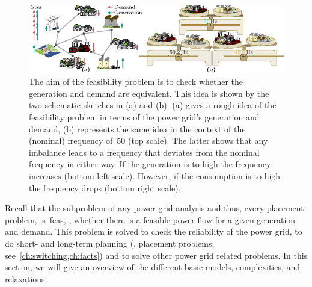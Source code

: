 % 
\begin{figure}[t!]
    \includegraphics{foundations/figures/feasibility-problem.pdf}
    \caption[Simple description of the feasibility problem.]{The aim of the
    feasibility problem is to check whether the generation and demand are
    equivalent. This idea is shown by the two schematic sketches in (a) and (b).
    (a) gives a rough idea of the feasibility problem in terms of the power
    grid's generation and demand, (b) represents the same idea in the context of
    the (nominal) frequency of~\SI{50}{} (top scale). The
    latter shows that any imbalance leads to a frequency that deviates from the
    nominal frequency in either way. If the generation is to high the frequency
    increases (bottom left scale). However, if the consumption is to high the
    frequency drops (bottom right scale).
    }%
    \label{ch:foundations:fig:feasibility-problem}
\end{figure}

Recall that the subproblem of any power grid analysis and thus, every placement
problem, is~\gls{feas}, \ie, whether there is a feasible power flow
for a given generation and demand. This problem is solved to check the
reliability of the power grid, to do short- and long-term planning (\ie,
placement problems; see~\cref{ch:switching,ch:facts}) and to solve other power
grid related problems. In this section, we will give an overview of the
different basic models, complexities, and relaxations.
% 
